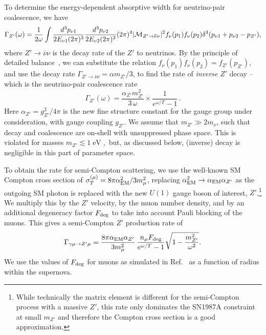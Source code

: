 \documentclass[11pt]{article}
\DeclareMathOperator{\ev}{eV} \DeclareMathOperator{\kev}{keV} \DeclareMathOperator{\mev}{MeV} \DeclareMathOperator{\gev}{GeV} \DeclareMathOperator{\tev}{TeV}  \DeclareMathOperator{\pev}{PeV} \DeclareMathOperator{\cm}{cm} \DeclareMathOperator{\barn}{barn} \DeclareMathOperator{\g}{g} \DeclareMathOperator{\km}{km} \DeclareMathOperator{\pb}{pb} \DeclareMathOperator{\s}{s} \DeclareMathOperator{\yr}{yr}\DeclareMathOperator{\gyr}{Gyr} \DeclareMathOperator{\kg}{kg} \DeclareMathOperator{\mpc}{Mpc} \DeclareMathOperator{\few}{few} \DeclareMathOperator{\kel}{K}
\newcommand{\beq}{\begin{equation}} \newcommand{\eeq}{\end{equation}}
\begin{document}
To determine the energy-dependent absorptive width for neutrino-pair coalescence, we have
\begin{equation}  \label{zp-sC}
\Gamma_{Z'}(\omega) = \frac{1}{2\omega}\int\dfrac{d^3p_{\nu1}}{2E_{\nu 1}(2\pi)^3}\dfrac{d^3p_{\nu 2}}{2E_{\nu 2}(2\pi)^3}
(2\pi)^4|{\cal M}_{Z'\rightarrow\overline{\nu}\nu}|^2 f_\nu(p_1)f_\nu(p_2)\delta^4(p_{\nu1}+p_{\nu2}-p_{Z'}),
\end{equation}
where $Z'\rightarrow\overline{\nu}\nu$ is the decay rate of the $Z'$ to neutrinos. By the principle of detailed balance~\cite{Weldon:1983jn}, we can substitute the relation $f_\nu(p_1)f_\nu(p_2)=f_{Z'}(p_{Z'})$, and use the decay rate $\Gamma_{Z'\rightarrow\overline{\nu}\nu}=\alpha m_{Z'}/3$, to find the rate of \textit{inverse} $Z'$ decay -- which is the neutrino-pair coalescence rate
\begin{equation}
\Gamma_{Z'}(\omega) = \frac{\alpha_{Z'} m_{Z'}^2}{3 \, \omega} \times \frac{1}{e^{\omega/T}-1}\,.
\label{nu-coalescence}
\end{equation}
Here $\alpha_{Z'}=g_{Z'}^2/4\pi$ is the new fine structure constant for the gauge group under consideration, with gauge coupling $g_{Z'}$.  We assume that $m_{Z'} \gg 2m_\nu$, such that decay and coalescence are on-shell with unsuppressed phase space. This is violated for masses $m_{Z'} \lesssim 1\ev,$ but, as discussed below, (inverse) decay is negligible in this part of parameter space.

To obtain the rate for semi-Compton scattering, we use the well-known SM Compton cross section of $\sigma_T^{(\mu)} = 8\pi \alpha_{\rm EM}^2/3m_\mu^2$, replacing $\alpha_{\rm EM}^2\to\alpha_{\rm EM}\alpha_{Z'}$ as the outgoing SM photon is replaced with the new $U(1)$ gauge boson of interest, $Z'$.\footnote{While technically the matrix element is different for the semi-Compton process with a massive $Z'$, this rate only dominates the SN1987A constraint at small $m_{Z'}$ and therefore the Compton cross section is a good approximation.} We multiply this by the $Z'$ velocity, by the muon number density, and by an additional degeneracy factor $F_{\rm deg}$ to take into account Pauli blocking of the muons. This gives a semi-Compton $Z'$ production rate of 
\beq \label{semi-Compton}
\Gamma_{\gamma \mu \to Z' \mu} = \frac{8\pi\alpha_{\rm EM} \alpha_{Z'}}{3m_\mu^2} \, \frac{n_\mu F_{\rm deg}}{e^{\omega/T}-1} \sqrt{1-\frac{m_{Z'}^2}{\omega^2}}.
\eeq
We use the values of $F_{\rm deg}$ for muons as simulated in Ref.~\cite{Bollig:2020xdr} as a function of radius within the supernova.
\end{document}
